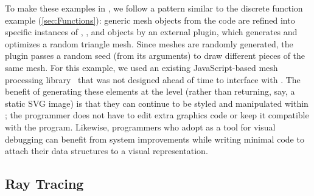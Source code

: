To make these examples in \Penrose{}, we follow a pattern similar to the discrete function example (\cref{sec:Functions}): generic mesh objects from the \Substance{} code are refined into specific instances of , , and  objects by an external plugin, which generates and optimizes a random triangle mesh.  Since meshes are randomly generated, the plugin passes a random seed (from its \Style{} arguments) to draw different pieces of the same mesh.  For this example, we used an existing JavaScript-based mesh processing library~\cite{Sawhney:2017:GPJ} that was not designed ahead of time to interface with \Penrose{}.  The benefit of generating these elements at the \Substance{} level (rather than returning, say, a static SVG image) is that they can continue to be styled and manipulated within \Penrose{}; the programmer does not have to edit extra graphics code or keep it compatible with the \Style{} program.  Likewise, programmers who adopt \Penrose{} as a tool for visual debugging can benefit from system improvements while writing minimal code to attach their data structures to a visual representation.




     
\subsection{Ray Tracing}
\label{sec:RayTracing}

